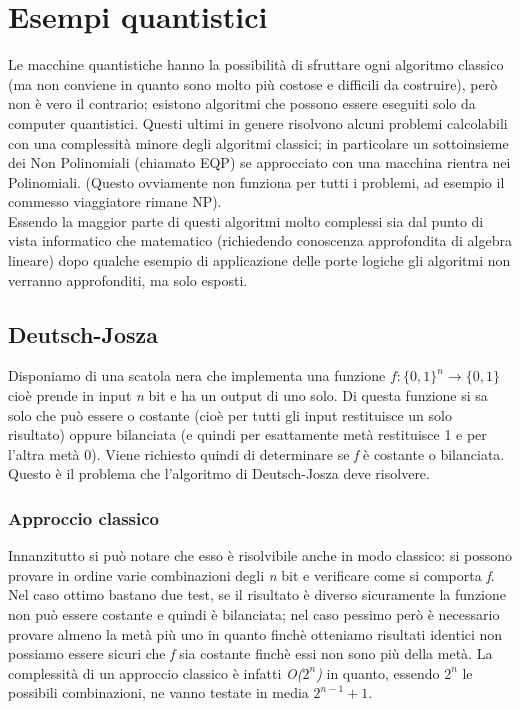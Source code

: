 \section{Esempi quantistici}
Le macchine quantistiche hanno la possibilità di sfruttare ogni algoritmo classico (ma non conviene in quanto sono molto più costose e difficili da costruire), però non è vero il contrario; esistono algoritmi che possono essere eseguiti solo da computer quantistici.
Questi ultimi in genere risolvono alcuni problemi calcolabili con una complessità minore degli algoritmi classici; in particolare un sottoinsieme dei Non Polinomiali (chiamato EQP) se approcciato con una macchina rientra nei Polinomiali. (Questo ovviamente non funziona per tutti i problemi, ad esempio il commesso viaggiatore rimane NP).\\
Essendo la maggior parte di questi algoritmi molto complessi sia dal punto di vista informatico che matematico (richiedendo conoscenza approfondita di algebra lineare) dopo qualche esempio di applicazione delle porte logiche gli algoritmi non verranno approfonditi, ma solo esposti.
\subsection{Deutsch-Josza}
Disponiamo di una scatola nera che implementa una funzione \textit{$f: \{0,1\}^n \rightarrow \{0,1\}$} cioè prende in input \textit{n} bit e ha un output di uno solo. Di questa funzione si sa solo che può essere o costante (cioè per tutti gli input restituisce un solo risultato) oppure bilanciata (e quindi per esattamente metà restituisce 1 e per l'altra metà 0). Viene richiesto quindi di determinare se \textit{f} è costante o bilanciata.
Questo è il problema che l'algoritmo di Deutsch-Josza deve risolvere.
\subsubsection{Approccio classico}
Innanzitutto si può notare che esso è risolvibile anche in modo classico: si possono provare in ordine varie combinazioni degli \textit{n} bit e verificare come si comporta \textit{f}. Nel caso ottimo bastano due test, se il risultato è diverso sicuramente la funzione non può essere costante e quindi è bilanciata; nel caso pessimo però è necessario provare almeno la metà più uno in quanto finchè otteniamo risultati identici non possiamo essere sicuri che \textit{f} sia costante finchè essi non sono più della metà. La complessità di un approccio classico è infatti \textit{O($2^n$)} in quanto, essendo $2^n$ le possibili combinazioni, ne vanno testate in media $2^{n-1} + 1$.
